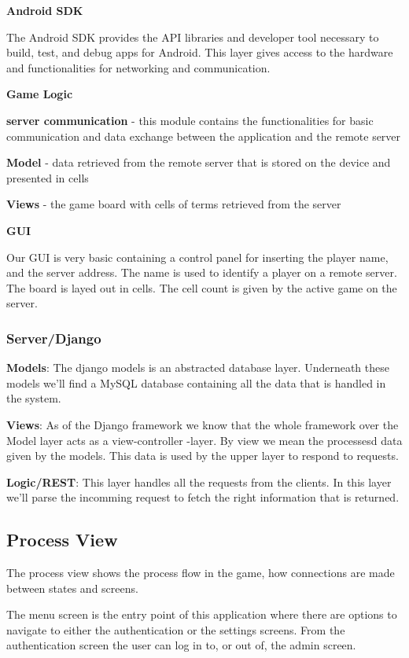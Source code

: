 {\bf Android SDK}

The Android SDK provides the API libraries and developer tool necessary to build, 
test, and debug apps for Android. This layer gives access to the hardware and 
functionalities for networking and communication.


{\bf Game Logic}

{\bf server communication} - this module contains the functionalities for 
basic communication and data exchange between the application and the
remote server

{\bf Model} - data retrieved from the remote server that is stored on the device
and presented in cells

{\bf Views} - the game board with cells of terms retrieved from the server


{\bf GUI}

Our GUI is very basic containing a control panel for inserting the player name, 
and the server address. The name is used to identify a player on a remote server.
The board is layed out in cells. The cell count is given by the active game on the server.

\subsubsection{Server/Django}

{\bf Models}: The django models is an abstracted database layer. Underneath these models we'll
find a MySQL database containing all the data that is handled in the system.

{\bf Views}: As of the Django framework we know that the whole framework over the Model layer acts
as a view-controller -layer. By view we mean the processesd data given by the models.
This data is used by the upper layer to respond to requests.

{\bf Logic/REST}: This layer handles all the requests from the clients. In this layer we'll parse the
incomming request to fetch the right information that is returned.


\subsection{Process View}
The process view shows the process flow in the game, how connections are made
between states and screens.

The menu screen is the entry point of this application where there are options
to navigate to either the authentication or the settings screens. From the
authentication screen the user can log in to, or out of, the admin screen.

